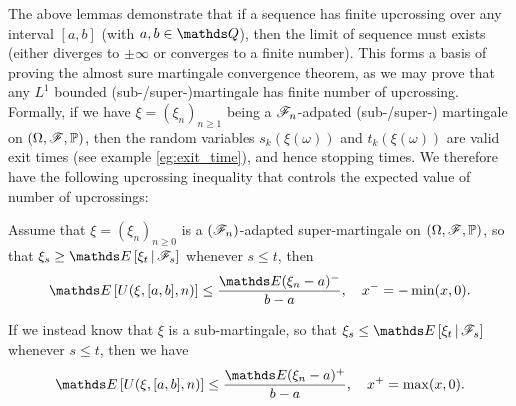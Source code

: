 The above lemmas demonstrate that if a sequence has finite upcrossing over any interval $[a,b]$ (with $a,b \in \Q$), then the limit of sequence must exists (either diverges to $\pm \infty$ or converges to a finite number). This forms a basis of proving the almost sure martingale convergence theorem, as we may prove that any $L^1$ bounded (sub-/super-)martingale has finite number of upcrossing. Formally, if we have $\xi = (\xi_n)_{n\geq 1}$ being a $\mathcal{F}_n$-adpated (sub-/super-) martingale on $(\Omega,\mathcal{F},\mathbb{P})$, then the random variables $s_k(\xi(\omega))$ and $t_k(\xi(\omega))$ are valid exit times (see example \ref{eg:exit_time}), and hence stopping times. We therefore have the following upcrossing inequality that controls the expected value of number of upcrossings:

\begin{lemma} \label{lem:upcrossing_ineq}
Assume that $\xi = (\xi_n)_{n\geq 0}$ is a $(\mathcal{F}_n)$-adapted super-martingale on $(\Omega,\mathcal{F},\mathbb{P})$, so that $\xi_s \geq \E\sqbracket{\xi_t \,|\, \F_s}$ whenever $s\leq t$, then 
\begin{equation}
    \E\sqbracket{U(\xi,[a,b],n)} \leq \frac{\E(\xi_n - a)^{-}}{b-a}, \quad x^- = -\min(x,0).
\end{equation}
\end{lemma}

\begin{remark}
If we instead know that $\xi$ is a sub-martingale, so that $\xi_s \leq \E\sqbracket{\xi_t \,|\, \F_s}$ whenever $s\leq t$, then we have
\begin{equation}
    \E\sqbracket{U(\xi,[a,b],n)} \leq \frac{\E(\xi_n - a)^{+}}{b-a}, \quad x^+ = \max(x,0).
\end{equation}
\end{remark}

